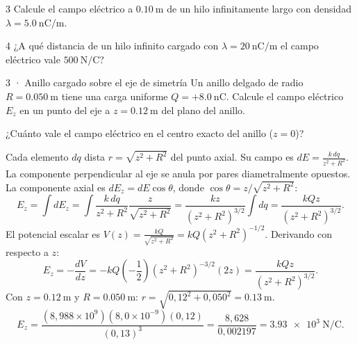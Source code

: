\documentclass[11pt]{article}
\begin{document}
\begin{eReto}{3 }
Calcule el campo eléctrico a $\SI{0,10}{\metre}$ de un hilo infinitamente largo con densidad $\lambda=\SI{5,0}{\nano\coulomb\per\metre}$.
\end{eReto}

\begin{eReto}{4 }
¿A qué distancia de un hilo infinito cargado con $\lambda=\SI{20}{\nano\coulomb\per\metre}$ el campo eléctrico vale $\SI{500}{\newton\per\coulomb}$?
\end{eReto}


\begin{eResuelto}{3 · Anillo cargado sobre el eje de simetría}
Un anillo delgado de radio $R=\SI{0,050}{\metre}$ tiene una carga uniforme $Q=+\SI{8,0}{\nano\coulomb}$. Calcule el campo eléctrico $E_z$ en un punto del eje a $z=\SI{0,12}{\metre}$ del plano del anillo.
\begin{center}
\end{center}
\begin{ePredice}¿Cuánto vale el campo eléctrico en el centro exacto del anillo ($z=0$)?\end{ePredice}
Cada elemento $dq$ dista $r=\sqrt{z^2+R^2}$ del punto axial. Su campo es $dE=\frac{k\,dq}{z^2+R^2}$.
La componente perpendicular al eje se anula por pares diametralmente opuestos. La componente axial es $dE_z=dE\cos\theta$, donde $\cos\theta=z/\sqrt{z^2+R^2}$:
\[ E_z = \int dE_z = \int \frac{k\,dq}{z^2+R^2}\frac{z}{\sqrt{z^2+R^2}} = \frac{kz}{(z^2+R^2)^{3/2}}\int dq = \frac{kQz}{(z^2+R^2)^{3/2}}. \]
El potencial escalar es $V(z)=\frac{kQ}{\sqrt{z^2+R^2}}=kQ(z^2+R^2)^{-1/2}$.
Derivando con respecto a $z$:
\[ E_z = -\frac{dV}{dz} = -kQ\left(-\frac{1}{2}\right)(z^2+R^2)^{-3/2}(2z) = \frac{kQz}{(z^2+R^2)^{3/2}}. \]
Con $z=\SI{0,12}{\metre}$ y $R=\SI{0,050}{\metre}$: $r=\sqrt{0{,}12^2+0{,}050^2}=\SI{0,13}{\metre}$.
\[ E_z = \frac{(8{,}988\times10^9)(8{,}0\times10^{-9})(0{,}12)}{(0{,}13)^3} = \frac{8{,}628}{0{,}002197} = \SI{3,93e3}{\newton\per\coulomb}. \]
\end{eResuelto}
\end{document}
